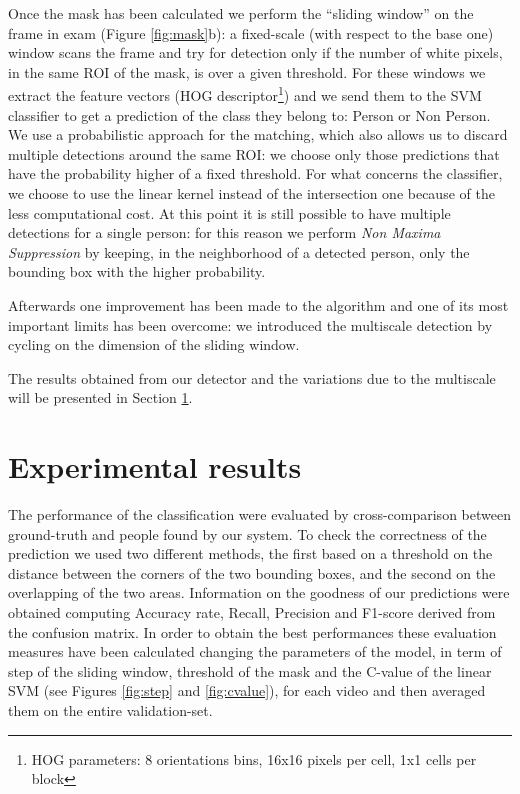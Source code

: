 \documentclass[a4paper, 10pt, onecolumn]{article} %
\begin{document}
Once the mask has been calculated we perform the ``sliding window'' on the frame in exam (Figure \ref{fig:mask}b): a fixed-scale (with respect to the base one) window scans the frame and try for detection only if the number of white pixels, in the same ROI of the mask, is over a given threshold. For these windows we extract the feature vectors (HOG descriptor\footnote{HOG parameters: 8 orientations bins, 16x16 pixels per cell, 1x1 cells per block}) and we send them to the SVM classifier to get a prediction of the class they belong to: Person or Non Person. We use a probabilistic approach for the matching, which also allows us to discard multiple detections around the same ROI: we choose only those predictions that have the probability higher of a fixed threshold. For what concerns the classifier, we choose to use the linear kernel instead of the intersection one because of the less computational cost. At this point it is still possible to have multiple detections for a single person: for this reason we perform \emph{Non Maxima Suppression} by keeping, in the neighborhood  of a detected person, only the bounding box with the higher probability.

Afterwards one improvement has been made to the algorithm and one of its most important limits has been overcome: we introduced the multiscale detection by cycling on the dimension of the sliding window. 

The results obtained from our detector and the variations due to the multiscale will be presented in Section \ref{results}.




\section{Experimental results}\label{results}
The performance of the classification were evaluated by cross-comparison between ground-truth and people found by our system. To check the correctness of the prediction we used two different methods, the first based on a threshold on the distance between the corners of the two bounding boxes, and the second on the overlapping of the two areas. Information on the goodness of our predictions were obtained computing Accuracy rate, Recall, Precision and F1-score derived from the confusion matrix. In order to obtain the best performances these evaluation measures have been calculated changing the parameters of the model, in term of step of the sliding window, threshold of the mask and the C-value of the linear SVM (see Figures \ref{fig:step} and \ref{fig:cvalue}), for each video and then averaged them on the entire validation-set.
\end{document}
